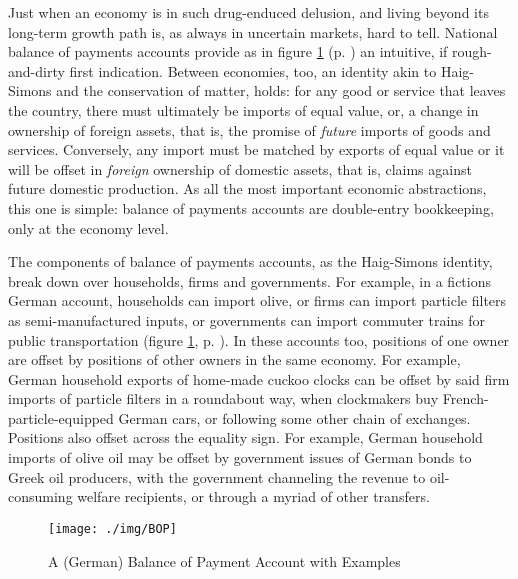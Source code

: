 \documentclass[11pt,a4paper,oneside,openright]{article}
\begin{document}
Just when an economy is in such drug-enduced delusion, and living beyond its long-term growth path is, as always in uncertain markets, hard to tell. National balance of payments accounts provide as in figure \ref{fig:BoP} (p. \pageref{fig:BoP}) an intuitive, if rough-and-dirty first indication. Between economies, too, an identity akin to Haig-Simons and the conservation of matter, holds: for any good or service that leaves the country, there must ultimately be imports of equal value, or, a change in ownership of foreign assets, that is, the promise of \emph{future} imports of goods and services. Conversely, any import must be matched by exports of equal value or it will be offset in \emph{foreign} ownership of domestic assets, that is, claims against future domestic production. As all the most important economic abstractions, this one is simple: balance of payments accounts are double-entry bookkeeping, only at the economy level.  

The components of balance of payments accounts, as the Haig-Simons identity, break down over households, firms and governments. For example, in a fictions German account, households can import olive, or firms can import particle filters as semi-manufactured inputs, or governments can import commuter trains for public transportation (figure \ref{fig:BoP}, p. \pageref{fig:BoP}). In these accounts too, positions of one owner are offset by positions of other owners in the same economy. For example, German household exports of home-made cuckoo clocks can be offset by said firm imports of particle filters in a roundabout way, when clockmakers buy French-particle-equipped German cars, or following some other chain of exchanges. Positions  also offset across the equality sign. For example, German household imports of olive oil may be offset by government issues of German bonds to Greek oil producers, with the government channeling the revenue to oil-consuming welfare recipients, or through a myriad of other transfers.

\begin{figure}[htbp]
	\begin{center}
	\texttt{[image: ./img/BOP]}  
	\caption{A (German) Balance of Payment Account with Examples}
	\label{fig:BoP}
	\end{center}
\end{figure}
\end{document}
